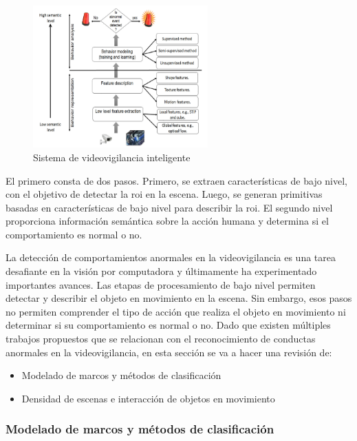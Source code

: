 \begin{figure}[ht]
\centering
\includegraphics[width=0.6\textwidth]{img/chapters/estado-del-arte/video-surveillance-system.png}
\caption{\label{fig:video-surveillance-system}Sistema de videovigilancia inteligente \cite{BENMABROUK2018480}}
\end{figure}

El primero consta de dos pasos. Primero, se extraen características de bajo nivel, con el objetivo de detectar la \gls{roi} en la escena. Luego, se generan primitivas basadas en características de bajo nivel para describir la \gls{roi}. El segundo nivel proporciona información semántica sobre la acción humana y determina si el comportamiento es normal o no.

La detección de comportamientos anormales en la videovigilancia es una tarea desafiante en la visión por computadora y últimamente ha experimentado importantes avances. Las etapas de procesamiento de bajo nivel permiten detectar y describir el objeto en movimiento en la escena. Sin embargo, esos pasos no permiten comprender el tipo de acción que realiza el objeto en movimiento ni determinar si su comportamiento es normal o no. Dado que existen múltiples trabajos propuestos que se relacionan con el reconocimiento de conductas anormales en la videovigilancia, en esta sección se va a hacer una revisión de:

\begin{itemize}
    \item Modelado de marcos y métodos de clasificación
    \item Densidad de escenas e interacción de objetos en movimiento
\end{itemize}

\subsubsection*{Modelado de marcos y métodos de clasificación}
\label{subsubsec:modelado-frameworks-métodos-clasificación}


